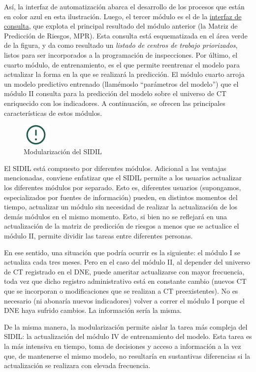 \documentclass[
]{article}
\begin{document}
Así, la interfaz de automatización abarca el desarrollo de los procesos que están en color azul en esta ilustración. Luego, el tercer módulo es el de la \protect\hyperlink{interfazConsultaexplicaciongeneral}{interfaz de consulta}, que explota el principal resultado del módulo anterior (la Matriz de Predicción de Riesgos, MPR). Esta consulta está esquematizada en el área verde de la figura, y da como resultado un \emph{listado de centros de trabajo priorizados}, listos para ser incorporados a la programación de inspecciones. Por último, el cuarto módulo, de entrenamiento, es el que permite reentrenar el modelo para actualizar la forma en la que se realizará la predicción. El módulo cuarto arroja un modelo predictivo entrenado (llamémoslo ``parámetros del modelo'') que el módulo II consulta para la predicción del modelo sobre el universo de CT enriquecido con los indicadores. A continuación, se ofrecen las principales características de estos módulos.

\begin{figure}
\includegraphics[width=50px,style="float:left; background-color: #fff; padding-right:1em"]{images-1/important-icon} \caption{Modularización del SIDIL}\label{fig:modularizacionSIDIL}
\end{figure}

\begin{rmdcomment}
El SIDIL está compuesto por diferentes módulos. Adicional a las ventajas
mencionadas, conviene enfatizar que el SIDIL permite a los usuarios
actualizar los diferentes módulos por separado. Esto es, diferentes
usuarios (supongamos, especializados por fuentes de información) pueden,
en distintos momentos del tiempo, actualizar un módulo sin necesidad de
realizar la actualización de los demás módulos en el mismo momento.
Esto, si bien no se reflejará en una actualización de la matriz de
predicción de riesgos a menos que se actualice el módulo II, permite
dividir las tareas entre diferentes personas.

En ese sentido, una situación que podría ocurrir es la siguiente: el
módulo I se actualiza cada tres meses. Pero en el caso del módulo II, al
depender del universo de CT registrado en el DNE, puede ameritar
actualizarse con mayor frecuencia, toda vez que dicho registro
administrativo está en constante cambio (nuevos CT que se incorporan o
modificaciones que se realizan a CT preexistentes). No es necesario (ni
abonaría nuevos indicadores) volver a correr el módulo I porque el DNE
haya sufrido cambios. La información sería la misma.

De la misma manera, la modularización permite aislar la tarea más
compleja del SIDIL: la actualización del módulo IV de entrenamiento del
modelo. Esta tarea es la más intensiva en tiempo, toma de decisiones y
acceso a información a la vez que, de mantenerse el mismo modelo, no
resultaría en sustantivas diferencias si la actualización se realizara
con elevada frecuencia.
\end{rmdcomment}
\end{document}
